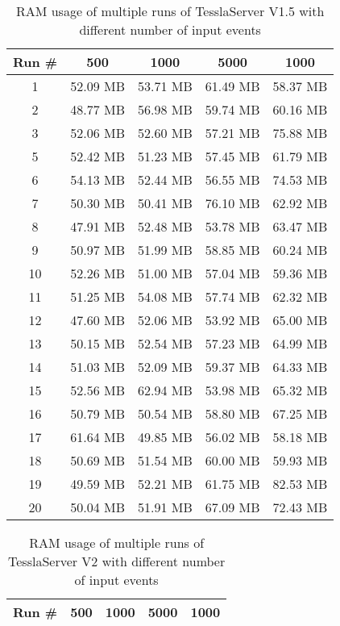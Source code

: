 \begin{table}[!htb]
  \centering
  \caption{RAM usage of multiple runs of TesslaServer V1.5 with different number of input events}
  \label{table:tessla_server_v1_5_events_ram_usage_data}
  \begin{tabular}{cllll}
    Run \# & \multicolumn{1}{c}{500} & \multicolumn{1}{c}{1000} & \multicolumn{1}{c}{5000} & \multicolumn{1}{c}{1000}\\ \hline
    1 & 52.09 MB & 53.71 MB & 61.49 MB & 58.37 MB \\
    2 & 48.77 MB & 56.98 MB & 59.74 MB & 60.16 MB \\
    3 & 52.06 MB & 52.60 MB & 57.21 MB & 75.88 MB \\
    5 & 52.42 MB & 51.23 MB & 57.45 MB & 61.79 MB \\
    6 & 54.13 MB & 52.44 MB & 56.55 MB & 74.53 MB \\
    7 & 50.30 MB & 50.41 MB & 76.10 MB & 62.92 MB \\
    8 & 47.91 MB & 52.48 MB & 53.78 MB & 63.47 MB \\
    9 & 50.97 MB & 51.99 MB & 58.85 MB & 60.24 MB \\
    10 &52.26 MB & 51.00 MB & 57.04 MB & 59.36 MB \\
    11 &51.25 MB & 54.08 MB & 57.74 MB & 62.32 MB \\
    12 &47.60 MB & 52.06 MB & 53.92 MB & 65.00 MB \\
    13 &50.15 MB & 52.54 MB & 57.23 MB & 64.99 MB \\
    14 &51.03 MB & 52.09 MB & 59.37 MB & 64.33 MB \\
    15 &52.56 MB & 62.94 MB & 53.98 MB & 65.32 MB \\
    16 &50.79 MB & 50.54 MB & 58.80 MB & 67.25 MB \\
    17 &61.64 MB & 49.85 MB & 56.02 MB & 58.18 MB \\
    18 &50.69 MB & 51.54 MB & 60.00 MB & 59.93 MB \\
    19 &49.59 MB & 52.21 MB & 61.75 MB & 82.53 MB \\
    20 &50.04 MB & 51.91 MB & 67.09 MB & 72.43 MB
  \end{tabular}
\end{table}

\begin{table}[!htb]
  \centering
  \caption{RAM usage of multiple runs of TesslaServer V2 with different number of input events}
  \label{table:tessla_server_v2_events_ram_usage_data}
  \begin{tabular}{cllll}
    Run \# & \multicolumn{1}{c}{500} & \multicolumn{1}{c}{1000} & \multicolumn{1}{c}{5000} & \multicolumn{1}{c}{1000}\\ \hline
  \end{tabular}
\end{table}

